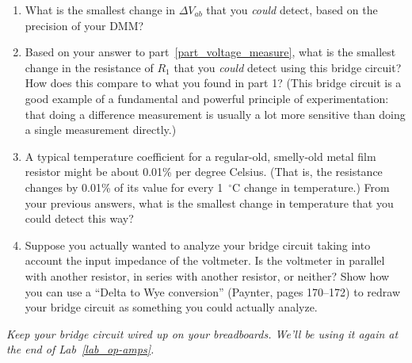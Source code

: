 \begin{enumerate}[wide]
\item What is the smallest change in $\Delta V_{ab}$ that you \textit{could} detect, based on the precision of your DMM? \label{part_voltage_measure}

\item Based on your answer to part~\ref{part_voltage_measure}, what is the smallest change in the resistance of $R_1$ that you \textit{could} detect using this bridge circuit?  How does this compare to what you found in part 1?  (This bridge circuit is a good example of a fundamental and powerful principle of experimentation: that doing a difference measurement is usually a lot more sensitive than doing a single measurement directly.)

\item A typical temperature coefficient for a regular-old, smelly-old metal film resistor might be about 0.01\% per degree Celsius.  (That is, the resistance changes by 0.01\% of its value for every 1~$^\circ$C change in temperature.)  From your previous answers, what is the smallest change in temperature that you could detect this way?

\item Suppose you actually wanted to analyze your bridge circuit taking into account the input impedance of the voltmeter.  Is the voltmeter in parallel with another resistor, in series with another resistor, or neither?  Show how you can use a ``Delta to Wye conversion'' (Paynter, pages 170--172) to redraw your bridge circuit as something you could actually analyze.

\end{enumerate}

\textit{Keep your bridge circuit wired up on your breadboards.  We'll be using it again at the end of Lab~\ref{lab_op-amps}.}






